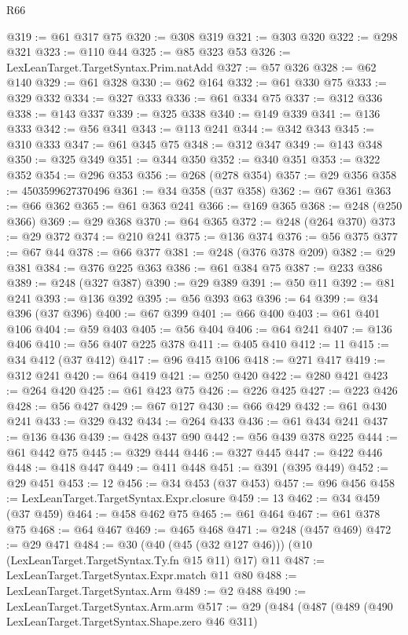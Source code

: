 \begin{lexlean}{R66}
\begin{coremodule}
@319 := @61 @317 @75
@320 := @308 @319
@321 := @303 @320
@322 := @298 @321
@323 := @110 @44
@325 := @85 @323 @53
@326 := LexLeanTarget.TargetSyntax.Prim.natAdd
@327 := @57 @326
@328 := @62 @140
@329 := @61 @328
@330 := @62 @164
@332 := @61 @330 @75
@333 := @329 @332
@334 := @327 @333
@336 := @61 @334 @75
@337 := @312 @336
@338 := @143 @337
@339 := @325 @338
@340 := @149 @339
@341 := @136 @333
@342 := @56 @341
@343 := @113 @241
@344 := @342 @343
@345 := @310 @333
@347 := @61 @345 @75
@348 := @312 @347
@349 := @143 @348
@350 := @325 @349
@351 := @344 @350
@352 := @340 @351
@353 := @322 @352
@354 := @296 @353
@356 := @268 (@278 @354)
@357 := @29 @356
@358 := 4503599627370496
@361 := @34 @358 (@37 @358)
@362 := @67 @361
@363 := @66 @362
@365 := @61 @363 @241
@366 := @169 @365
@368 := @248 (@250 @366)
@369 := @29 @368
@370 := @64 @365
@372 := @248 (@264 @370)
@373 := @29 @372
@374 := @210 @241
@375 := @136 @374
@376 := @56 @375
@377 := @67 @44
@378 := @66 @377
@381 := @248 (@376 @378 @209)
@382 := @29 @381
@384 := @376 @225 @363
@386 := @61 @384 @75
@387 := @233 @386
@389 := @248 (@327 @387)
@390 := @29 @389
@391 := @50 @11
@392 := @81 @241
@393 := @136 @392
@395 := @56 @393 @63
@396 := 64
@399 := @34 @396 (@37 @396)
@400 := @67 @399
@401 := @66 @400
@403 := @61 @401 @106
@404 := @59 @403
@405 := @56 @404
@406 := @64 @241
@407 := @136 @406
@410 := @56 @407 @225 @378
@411 := @405 @410
@412 := 11
@415 := @34 @412 (@37 @412)
@417 := @96 @415 @106
@418 := @271 @417
@419 := @312 @241
@420 := @64 @419
@421 := @250 @420
@422 := @280 @421
@423 := @264 @420
@425 := @61 @423 @75
@426 := @226 @425
@427 := @223 @426
@428 := @56 @427
@429 := @67 @127
@430 := @66 @429
@432 := @61 @430 @241
@433 := @329 @432
@434 := @264 @433
@436 := @61 @434 @241
@437 := @136 @436
@439 := @428 @437 @90
@442 := @56 @439 @378 @225
@444 := @61 @442 @75
@445 := @329 @444
@446 := @327 @445
@447 := @422 @446
@448 := @418 @447
@449 := @411 @448
@451 := @391 (@395 @449)
@452 := @29 @451
@453 := 12
@456 := @34 @453 (@37 @453)
@457 := @96 @456
@458 := LexLeanTarget.TargetSyntax.Expr.closure
@459 := 13
@462 := @34 @459 (@37 @459)
@464 := @458 @462 @75
@465 := @61 @464
@467 := @61 @378 @75
@468 := @64 @467
@469 := @465 @468
@471 := @248 (@457 @469)
@472 := @29 @471
@484 := @30 (@40 (@45 (@32 @127 @46))) (@10 (LexLeanTarget.TargetSyntax.Ty.fn @15 @11) @17) @11
@487 := LexLeanTarget.TargetSyntax.Expr.match @11 @80
@488 := LexLeanTarget.TargetSyntax.Arm
@489 := @2 @488
@490 := LexLeanTarget.TargetSyntax.Arm.arm
@517 := @29
    (@484
      (@487
        (@489
          (@490 LexLeanTarget.TargetSyntax.Shape.zero @46 @311)

\end{coremodule}
\end{lexlean}
